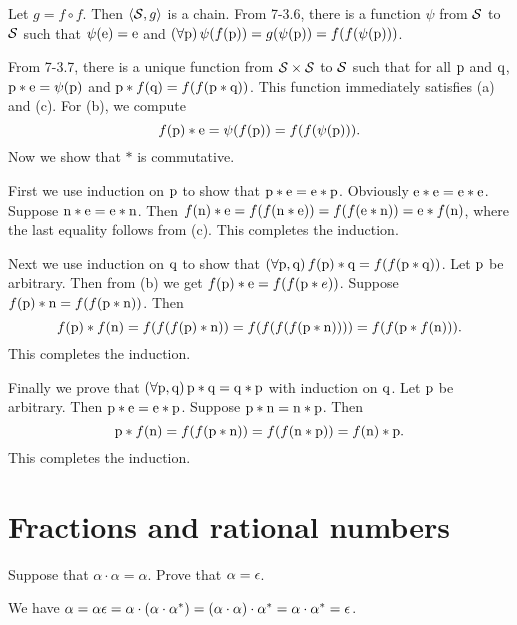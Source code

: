 \begin{solution}
Let $g=f\circ f$. Then $\left\langle\mathcal{S},g\right\rangle$ is a chain.
From 7-3.6, there is a function $\psi$ from $\mathcal{S}$ to $\mathcal{S}$ such that $\psi(\mathrm{e})=\mathrm{e}$
and $(\forall \mathrm{p})\thinspace\psi(f(\mathrm{p}))=g(\psi(\mathrm{p}))=f(f(\psi(\mathrm{p})))$.

From 7-3.7, there is a unique function from
$\mathcal{S}\times \mathcal{S}$ to $\mathcal{S}$ such that for all $\mathrm{p}$ and $\mathrm{q}$, $\mathrm{p}\ast\mathrm{e} = \psi(\mathrm{p})$
and $\mathrm{p}\ast f(\mathrm{q}) = f(f(\mathrm{p}\ast\mathrm{q}))$. This function immediately satisfies
(a) and (c).
For (b), we compute
\[f(\mathrm{p})\ast \mathrm{e} = \psi(f(\mathrm{p}))=f(f(\psi(\mathrm{p}))).\]
Now we show that $\ast$ is commutative.

First we use induction on $\mathrm{p}$ to show that $\mathrm{p}\ast \mathrm{e}=\mathrm{e}\ast\mathrm{p}$.
Obviously $\mathrm{e}\ast\mathrm{e}=\mathrm{e}\ast\mathrm{e}$. Suppose $\mathrm{n}\ast\mathrm{e}=\mathrm{e}\ast\mathrm{n}$.
Then
$f(\mathrm{n})\ast\mathrm{e}=f(f(\mathrm{n}\ast \mathrm{e}))=f(f(\mathrm{e}\ast\mathrm{n}))=\mathrm{e}\ast f(\mathrm{n})$,
where the last equality follows from (c). This completes the induction.

Next we use induction on $\mathrm{q}$ to show that
$(\forall \mathrm{p}, \mathrm{q})\thinspace f(\mathrm{p})\ast \mathrm{q}=f(f(\mathrm{p}\ast\mathrm{q}))$.
Let $\mathrm{p}$ be arbitrary. Then from (b) we get $f(\mathrm{p})\ast \mathrm{e}=f(f(\mathrm{p}\ast e))$.
Suppose $f(\mathrm{p})\ast \mathrm{n}=f(f(\mathrm{p}\ast \mathrm{n}))$.
Then \[f(\mathrm{p})\ast f(\mathrm{n})=f(f(f(\mathrm{p})\ast\mathrm{n}))=f(f(f(f(\mathrm{p}\ast \mathrm{n}))))
=f(f(\mathrm{p}\ast f(\mathrm{n}))).\]
This completes the induction.

Finally we prove that $(\forall \mathrm{p}, \mathrm{q})\thinspace \mathrm{p}\ast\mathrm{q}=\mathrm{q}\ast\mathrm{p}$ with
induction on $\mathrm{q}$.
Let $\mathrm{p}$ be arbitrary.
Then $\mathrm{p}\ast\mathrm{e}=\mathrm{e}\ast\mathrm{p}$.
Suppose $\mathrm{p}\ast\mathrm{n}=\mathrm{n}\ast\mathrm{p}$.
Then
\[\mathrm{p}\ast f(\mathrm{n})=f(f(\mathrm{p}\ast\mathrm{n}))=f(f(\mathrm{n}\ast\mathrm{p}))=f(\mathrm{n})\ast \mathrm{p}.\]
This completes the induction.
\end{solution}


\section{Fractions and rational numbers}
\begin{exercise}
Suppose that $\alpha\cdot\alpha=\alpha$. Prove that $\alpha = \epsilon$.
\end{exercise}

\begin{solution}
We have $\alpha=\alpha\epsilon=\alpha\cdot (\alpha\cdot\alpha^*)=(\alpha\cdot\alpha)\cdot\alpha^*
=\alpha\cdot\alpha^*=\epsilon$.
\end{solution}

